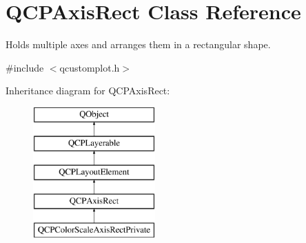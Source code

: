 \hypertarget{class_q_c_p_axis_rect}{}\section{Q\+C\+P\+Axis\+Rect Class Reference}
\label{class_q_c_p_axis_rect}


Holds multiple axes and arranges them in a rectangular shape.  




{\ttfamily \#include $<$qcustomplot.\+h$>$}

Inheritance diagram for Q\+C\+P\+Axis\+Rect\+:\begin{figure}[H]
\begin{center}
\leavevmode
\includegraphics[height=5.000000cm]{d8/dad/class_q_c_p_axis_rect}
\end{center}
\end{figure}
